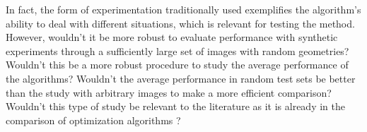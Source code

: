 				In fact, the form of experimentation traditionally used exemplifies the algorithm's ability to deal with different situations, which is relevant for testing the method. However, wouldn't it be more robust to evaluate performance with synthetic experiments through a sufficiently large set of images with random geometries? Wouldn't this be a more robust procedure to study the average performance of the algorithms? Wouldn't the average performance in random test sets be better than the study with arbitrary images to make a more efficient comparison? Wouldn't this type of study be relevant to the literature as it is already in the comparison of optimization algorithms \citep{beiranvand2017best}?
				
